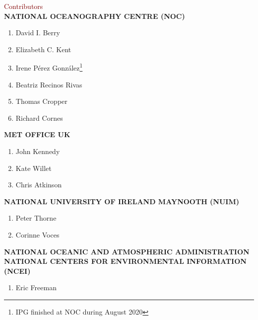 \newpage

\begin{adjustwidth}{2.cm}{}
\vspace* {10mm}

{\fontsize{20}{24} \selectfont \textcolor{maroon}{Contributors}}\\

{\fontsize{14}{17} \selectfont \textbf{\uppercase{{National Oceanography Centre (NOC)}}}}
\begin{enumerate}
\item David I. Berry
\item Elizabeth C. Kent
\item Irene Pérez González\footnote{IPG finished at NOC during August 2020}
\item Beatriz Recinos Rivas
\item Thomas Cropper
\item Richard Cornes
\end{enumerate}

{\fontsize{14}{17} \selectfont \textbf{\uppercase{{Met Office UK}}}}
\begin{enumerate}
\item John Kennedy
\item Kate Willet
\item Chris Atkinson
\end{enumerate}

{\fontsize{14}{17} \selectfont \textbf{\uppercase{National University of Ireland Maynooth (NUIM)}}}
\begin{enumerate}
\item Peter Thorne
\item Corinne Voces
\end{enumerate}

{\fontsize{14}{17} \selectfont \textbf{\uppercase{National Oceanic and Atmospheric Administration National Centers for Environmental Information (NCEI)}}}
\begin{enumerate}
\item Eric Freeman
\end{enumerate}

\end{adjustwidth}
